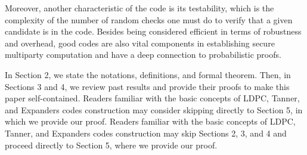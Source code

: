 Moreover, another characteristic of the code is its testability, which is the complexity of the number of random checks one must do to verify that a given candidate is in the code. Besides being considered efficient in terms of robustness and overhead, good codes are also vital components in establishing secure multiparty computation \cite{MultiParty} and have a deep connection to probabilistic proofs.

In Section 2, we state the notations, definitions, and formal theorem. Then, in Sections 3 and 4, we review past results and provide their proofs to make this paper self-contained. Readers familiar with the basic concepts of LDPC, Tanner, and Expanders codes construction may consider skipping directly to Section 5, in which we provide our proof.
Readers familiar with the basic concepts of LDPC, Tanner, and Expanders codes construction may skip Sections 2, 3, and 4 and proceed directly to Section 5, where we provide our proof.
